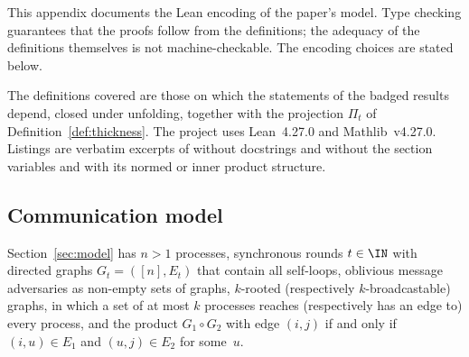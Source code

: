 This appendix documents the Lean encoding of the paper's model. Type checking guarantees that the proofs follow from the definitions; the adequacy of the definitions themselves is not machine-checkable. The encoding choices are stated below.

The definitions covered are those on which the statements of the badged results depend, closed under unfolding, together with the projection $\Pi_t$ of Definition~\ref{def:thickness}. The project uses Lean~4.27.0 and Mathlib~v4.27.0. Listings are verbatim excerpts of  without docstrings and without the section variables  and  with its normed or inner product structure.

\subsection{Communication model}\label{app:lean-communication}

Section~\ref{sec:model} has $n>1$ processes, synchronous rounds $t\in\IN$ with directed graphs $G_t=([n],E_t)$ that contain all self-loops, oblivious message adversaries as non-empty sets of graphs, $k$-rooted (respectively $k$-broadcastable) graphs, in which a set of at most $k$ processes reaches (respectively has an edge to) every process, and the product $G_1\circ G_2$ with edge $(i,j)$ if and only if $(i,u)\in E_1$ and $(u,j)\in E_2$ for some~$u$.

